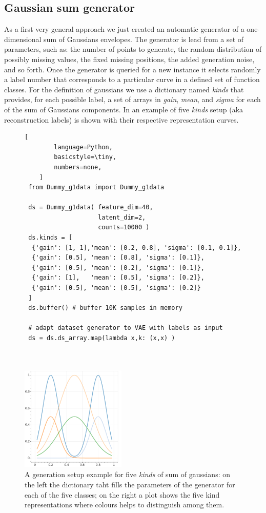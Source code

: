 \subsection{Gaussian sum generator}
\label{section: gaussian sum generator}
As a first very general approach we just created an automatic generator of a one-dimensional sum of Gaussians envelopes. 
The generator is lead from a set of parameters, such as: the number of points to generate, the random distribution of possibly missing values, the fixed missing positions, the added generation noise, and so forth. 
Once the generator is queried for a new instance it selects randomly a label number that corresponds to a particular curve in a defined set of function classes. For the definition of gaussians we use a dictionary named \textit{kinds} that provides, for each possible label, a set of arrays in \textit{gain},  \textit{mean}, and \textit{sigma} for each of the sum of Gaussians components.
In \Figure{\ref{fig:sum_of_gaussians}} an example of five \textit{kinds} setup (aka reconstruction labels) is shown with their respective representation curves. 
%
\begin{figure}
    \centering
    \begin{minipage}[b]{0.57\textwidth}
    \begin{lstlisting}[
        language=Python,
        basicstyle=\tiny,
        numbers=none,
    ]
 from Dummy_g1data import Dummy_g1data
 
 ds = Dummy_g1data( feature_dim=40, 
                    latent_dim=2, 
                    counts=10000 )
 ds.kinds = [
  {'gain': [1, 1],'mean': [0.2, 0.8], 'sigma': [0.1, 0.1]},
  {'gain': [0.5], 'mean': [0.8], 'sigma': [0.1]},
  {'gain': [0.5], 'mean': [0.2], 'sigma': [0.1]},
  {'gain': [1],   'mean': [0.5], 'sigma': [0.2]},
  {'gain': [0.5], 'mean': [0.5], 'sigma': [0.2]}
 ]
 ds.buffer() # buffer 10K samples in memory
 
 # adapt dataset generator to VAE with labels as input
 ds = ds.ds_array.map(lambda x,k: (x,x) )
 
 
    \end{lstlisting}
    \end{minipage}
    \hfill
    \begin{minipage}[b]{0.42\textwidth}
     \includegraphics[height=5cm]{img/STEP1/dummy_kinds.png}
    \end{minipage}
    \caption{A generation setup example for five \textit{kinds} of sum of gaussians: on the left the dictionary taht fills the parameters of the generator for each of the five classes; on the right a plot shows the five kind representations where colours helps to distinguish among them. }
    \label{fig:sum_of_gaussians}
\end{figure}
